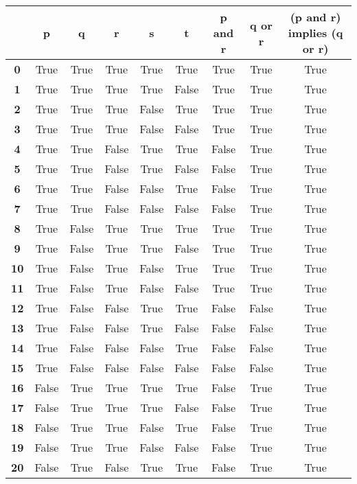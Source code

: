 \begin{tabular}{c|cccccccc}
 & \textbf{p} & \textbf{q} & \textbf{r} & \textbf{s} & \textbf{t} & \textbf{p and r} & \textbf{q or r} & \textbf{(p and r) implies (q or r)}\\\hline
\textbf{0} & True & True & True & True & True & True & True & True\\
\textbf{1} & True & True & True & True & False & True & True & True\\
\textbf{2} & True & True & True & False & True & True & True & True\\
\textbf{3} & True & True & True & False & False & True & True & True\\
\textbf{4} & True & True & False & True & True & False & True & True\\
\textbf{5} & True & True & False & True & False & False & True & True\\
\textbf{6} & True & True & False & False & True & False & True & True\\
\textbf{7} & True & True & False & False & False & False & True & True\\
\textbf{8} & True & False & True & True & True & True & True & True\\
\textbf{9} & True & False & True & True & False & True & True & True\\
\textbf{10} & True & False & True & False & True & True & True & True\\
\textbf{11} & True & False & True & False & False & True & True & True\\
\textbf{12} & True & False & False & True & True & False & False & True\\
\textbf{13} & True & False & False & True & False & False & False & True\\
\textbf{14} & True & False & False & False & True & False & False & True\\
\textbf{15} & True & False & False & False & False & False & False & True\\
\textbf{16} & False & True & True & True & True & False & True & True\\
\textbf{17} & False & True & True & True & False & False & True & True\\
\textbf{18} & False & True & True & False & True & False & True & True\\
\textbf{19} & False & True & True & False & False & False & True & True\\
\textbf{20} & False & True & False & True & True & False & True & True\\

\end{tabular}
